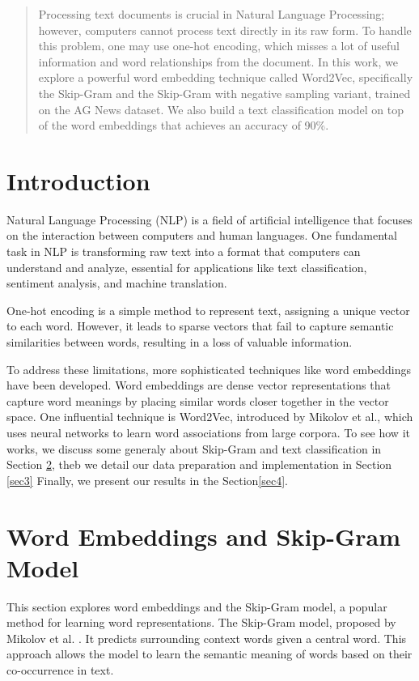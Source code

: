 \begin{abstract}
	Processing text documents is crucial in Natural Language Processing; however, computers cannot process text directly in its raw form. To handle this problem, one may use one-hot encoding, which misses a lot of useful information and word relationships from the document. In this work, we explore a powerful word embedding technique called Word2Vec, specifically the Skip-Gram and the Skip-Gram with negative sampling variant, trained on the AG News dataset. We also build a text classification model on top of the word embeddings that achieves an accuracy of 90\%.
\end{abstract}

\section{Introduction}
Natural Language Processing (NLP) is a field of artificial intelligence that focuses on the interaction between computers and human languages. One fundamental task in NLP is transforming raw text into a format that computers can understand and analyze, essential for applications like text classification, sentiment analysis, and machine translation.

One-hot encoding is a simple method to represent text, assigning a unique vector to each word. However, it leads to sparse vectors that fail to capture semantic similarities between words, resulting in a loss of valuable information.

To address these limitations, more sophisticated techniques like word embeddings have been developed. Word embeddings are dense vector representations that capture word meanings by placing similar words closer together in the vector space. One influential technique is Word2Vec, introduced by Mikolov et al., which uses neural networks to learn word associations from large corpora. To see how it works, we discuss some generaly about Skip-Gram and text classification in Section \ref{sec2}, theb we detail our data preparation and implementation in Section \ref{sec3} Finally, we present our results in the Section\ref{sec4}.

\section{Word Embeddings and Skip-Gram Model}\label{sec2}
This section explores word embeddings and the Skip-Gram model,
	a popular method for learning word representations. The Skip-Gram model, proposed by Mikolov et al. \cite{word2vec}. It predicts surrounding context words given a central word. This approach allows the model to learn the semantic meaning of words based on their co-occurrence in text.
